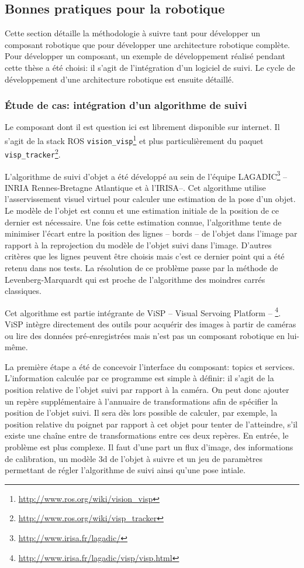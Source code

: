 \subsection{Bonnes pratiques pour la robotique}

Cette section détaille la méthodologie à suivre tant pour développer
un composant robotique que pour développer une architecture robotique
complète. Pour développer un composant, un exemple de développement
réalisé pendant cette thèse a été choisi: il s'agit de l'intégration
d'un logiciel de suivi. Le cycle de développement d'une architecture
robotique est ensuite détaillé.


\subsubsection{Étude de cas: intégration d'un algorithme de suivi}

Le composant dont il est question ici est librement disponible sur
internet. Il s'agit de la stack ROS
\texttt{vision\_visp}\footnote{\url{http://www.ros.org/wiki/vision_visp}}
et plus particulièrement du paquet
\texttt{visp\_tracker}\footnote{\url{http://www.ros.org/wiki/visp_tracker}}.


L'algorithme de suivi d'objet a été développé au sein de l'équipe
LAGADIC\footnote{\url{http://www.irisa.fr/lagadic/}} -- INRIA
Rennes-Bretagne Atlantique et à l'IRISA--. Cet algorithme utilise
l'asservissement visuel virtuel pour calculer une estimation de la
pose d'un objet. Le modèle de l'objet est connu et une estimation
initiale de la position de ce dernier est nécessaire. Une fois cette
estimation connue, l'algorithme tente de minimiser l'écart entre la
position des lignes -- bords -- de l'objet dans l'image par rapport à
la reprojection du modèle de l'objet suivi dans l'image. D'autres
critères que les lignes peuvent être choisis mais c'est ce dernier
point qui a été retenu dans nos tests. La résolution de ce problème
passe par la méthode de Levenberg-Marquardt qui est proche de
l'algorithme des moindres carrés classiques.


Cet algorithme est partie intégrante de ViSP -- Visual Servoing
Platform
-- \footnote{\url{http://www.irisa.fr/lagadic/visp/visp.html}}. ViSP
intègre directement des outils pour acquérir des images à partir de
caméras ou lire des données pré-enregistrées mais n'est pas un
composant robotique en lui-même.


La première étape a été de concevoir l'interface du composant: topics
et services. L'information calculée par ce programme est simple à
définir: il s'agit de la position relative de l'objet suivi par
rapport à la caméra. On peut donc ajouter un repère supplémentaire à
l'annuaire de transformations afin de spécifier la position de l'objet
suivi. Il sera dès lors possible de calculer, par exemple, la position
relative du poignet par rapport à cet objet pour tenter de
l'atteindre, s'il existe une chaîne entre de transformations entre ces
deux repères. En entrée, le problème est plus complexe. Il faut d'une
part un flux d'image, des informations de calibration, un modèle 3d de
l'objet à suivre et un jeu de paramètres permettant de régler
l'algorithme de suivi ainsi qu'une pose intiale.


